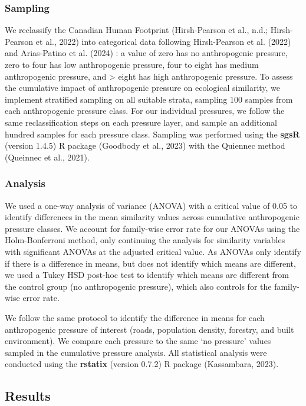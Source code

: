 \documentclass[
]{agujournal2019}
\begin{document}
\subsubsection{Sampling}\label{sampling}

We reclassify the Canadian Human Footprint (Hirsh-Pearson et al., n.d.;
Hirsh-Pearson et al., 2022) into categorical data following
Hirsh-Pearson et al. (2022) and Arias-Patino et al. (2024) : a value of
zero has no anthropogenic pressure, zero to four has low anthropogenic
pressure, four to eight has medium anthropogenic pressure, and
\textgreater{} eight has high anthropogenic pressure. To assess the
cumulative impact of anthropogenic pressure on ecological similarity, we
implement stratified sampling on all suitable strata, sampling 100
samples from each anthropogenic pressure class. For our individual
pressures, we follow the same reclassification steps on each pressure
layer, and sample an additional hundred samples for each pressure class.
Sampling was performed using the \textbf{sgsR} (version 1.4.5) R package
(Goodbody et al., 2023) with the Quiennec method (Queinnec et al.,
2021).

\subsubsection{Analysis}\label{analysis}

We used a one-way analysis of variance (ANOVA) with a critical value of
0.05 to identify differences in the mean similarity values across
cumulative anthropogenic pressure classes. We account for family-wise
error rate for our ANOVAs using the Holm-Bonferroni method, only
continuing the analysis for similarity variables with significant ANOVAs
at the adjusted critical value. As ANOVAs only identify if there is a
difference in means, but does not identify which means are different, we
used a Tukey HSD post-hoc test to identify which means are different
from the control group (no anthropogenic pressure), which also controls
for the family-wise error rate.

We follow the same protocol to identify the difference in means for each
anthropogenic pressure of interest (roads, population density, forestry,
and built environment). We compare each pressure to the same `no
pressure' values sampled in the cumulative pressure analysis. All
statistical analysis were conducted using the \textbf{rstatix} (version
0.7.2) R package (Kassambara, 2023).

\subsection{Results}\label{results}
\end{document}
